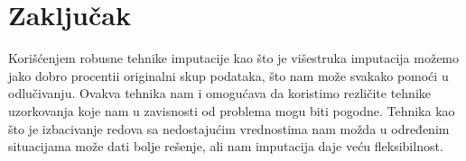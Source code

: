 \documentclass{article}
\begin{document}
\section*{Zaključak}

Korišćenjem robusne tehnike imputacije kao što je višestruka imputacija možemo jako dobro procentii originalni skup podataka, što nam može svakako pomoći u odlučivanju. Ovakva tehnika nam i omogućava da koristimo rezličite tehnike uzorkovanja koje nam u zavisnosti od problema mogu biti pogodne. Tehnika kao što je izbacivanje redova sa nedostajućim vrednostima nam možda u određenim situacijama može dati bolje rešenje, ali nam imputacija daje veću fleksibilnost.

\newpage



\end{document}
